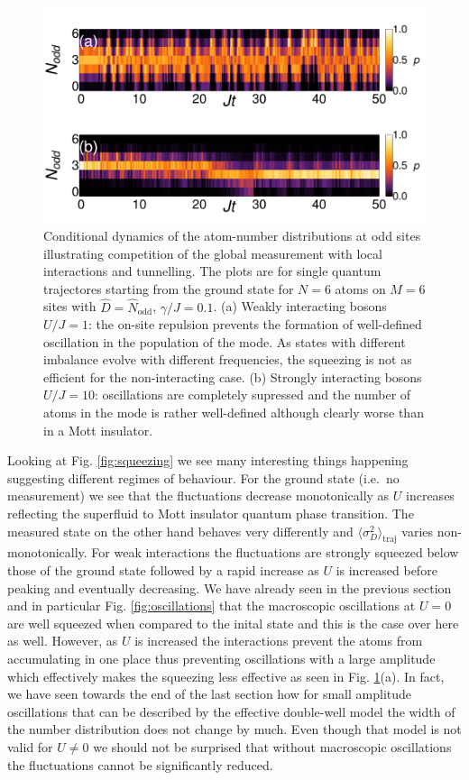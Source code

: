 \begin{figure}[htbp!]
  \centering
  \includegraphics[width=\textwidth]{panel_U}
  \caption[Trajectories in the presence of Interactions]{Conditional
    dynamics of the atom-number distributions at odd sites
    illustrating competition of the global measurement with local
    interactions and tunnelling. The plots are for single quantum
    trajectores starting from the ground state for $N = 6$ atoms on
    $M = 6$ sites with $\hat{D} = \hat{N}_\mathrm{odd}$,
    $\gamma/J = 0.1$. (a) Weakly interacting bosons $U/J = 1$: the
    on-site repulsion prevents the formation of well-defined
    oscillation in the population of the mode. As states with
    different imbalance evolve with different frequencies, the
    squeezing is not as efficient for the non-interacting case. (b)
    Strongly interacting bosons $U/J = 10$: oscillations are
    completely supressed and the number of atoms in the mode is rather
    well-defined although clearly worse than in a Mott insulator.}
  \label{fig:Utraj}
\end{figure}

Looking at Fig. \ref{fig:squeezing} we see many interesting things
happening suggesting different regimes of behaviour. For the ground
state (i.e.~no measurement) we see that the fluctuations decrease
monotonically as $U$ increases reflecting the superfluid to Mott
insulator quantum phase transition. The measured state on the other
hand behaves very differently and
$\langle \sigma^2_D \rangle_\mathrm{traj}$ varies
non-monotonically. For weak interactions the fluctuations are strongly
squeezed below those of the ground state followed by a rapid increase
as $U$ is increased before peaking and eventually decreasing. We have
already seen in the previous section and in particular
Fig. \ref{fig:oscillations} that the macroscopic oscillations at
$U = 0$ are well squeezed when compared to the inital state and this
is the case over here as well. However, as $U$ is increased the
interactions prevent the atoms from accumulating in one place thus
preventing oscillations with a large amplitude which effectively makes
the squeezing less effective as seen in Fig. \ref{fig:Utraj}(a). In
fact, we have seen towards the end of the last section how for small
amplitude oscillations that can be described by the effective
double-well model the width of the number distribution does not change
by much. Even though that model is not valid for $U \ne 0$ we should
not be surprised that without macroscopic oscillations the
fluctuations cannot be significantly reduced.

